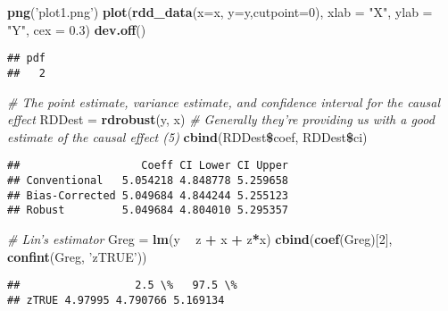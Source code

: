 \documentclass[]{article}
\newenvironment{Shaded}{\begin{snugshade}}{\end{snugshade}}
\newcommand{\KeywordTok}[1]{\textcolor[rgb]{0.13,0.29,0.53}{\textbf{#1}}}
\newcommand{\DataTypeTok}[1]{\textcolor[rgb]{0.13,0.29,0.53}{#1}}
\newcommand{\DecValTok}[1]{\textcolor[rgb]{0.00,0.00,0.81}{#1}}
\newcommand{\FloatTok}[1]{\textcolor[rgb]{0.00,0.00,0.81}{#1}}
\newcommand{\StringTok}[1]{\textcolor[rgb]{0.31,0.60,0.02}{#1}}
\newcommand{\CommentTok}[1]{\textcolor[rgb]{0.56,0.35,0.01}{\textit{#1}}}
\newcommand{\OperatorTok}[1]{\textcolor[rgb]{0.81,0.36,0.00}{\textbf{#1}}}
\newcommand{\NormalTok}[1]{#1}
\begin{document}
\begin{Shaded}
\begin{Highlighting}[]
\KeywordTok{png}\NormalTok{(}\StringTok{'plot1.png'}\NormalTok{)}
\KeywordTok{plot}\NormalTok{(}\KeywordTok{rdd_data}\NormalTok{(}\DataTypeTok{x=}\NormalTok{x, }\DataTypeTok{y=}\NormalTok{y,}\DataTypeTok{cutpoint=}\DecValTok{0}\NormalTok{), }
     \DataTypeTok{xlab =} \StringTok{"X"}\NormalTok{, }\DataTypeTok{ylab =} \StringTok{"Y"}\NormalTok{, }\DataTypeTok{cex =} \FloatTok{0.3}\NormalTok{)}
\KeywordTok{dev.off}\NormalTok{()}
\end{Highlighting}
\end{Shaded}

\begin{verbatim}
## pdf 
##   2
\end{verbatim}

\begin{Shaded}
\begin{Highlighting}[]
\CommentTok{# The point estimate, variance estimate, and confidence interval for the causal effect}
\NormalTok{RDDest =}\StringTok{ }\KeywordTok{rdrobust}\NormalTok{(y, x)}
\CommentTok{# Generally they're providing us with a good estimate of the causal effect (5)}
\KeywordTok{cbind}\NormalTok{(RDDest}\OperatorTok{\$}\NormalTok{coef, RDDest}\OperatorTok{\$}\NormalTok{ci)}
\end{Highlighting}
\end{Shaded}

\begin{verbatim}
##                   Coeff CI Lower CI Upper
## Conventional   5.054218 4.848778 5.259658
## Bias-Corrected 5.049684 4.844244 5.255123
## Robust         5.049684 4.804010 5.295357
\end{verbatim}

\begin{Shaded}
\begin{Highlighting}[]
\CommentTok{# Lin's estimator}
\NormalTok{Greg =}\StringTok{ }\KeywordTok{lm}\NormalTok{(y }\OperatorTok{~}\StringTok{ }\NormalTok{z }\OperatorTok{+}\StringTok{ }\NormalTok{x }\OperatorTok{+}\StringTok{ }\NormalTok{z}\OperatorTok{*}\NormalTok{x)}
\KeywordTok{cbind}\NormalTok{(}\KeywordTok{coef}\NormalTok{(Greg)[}\DecValTok{2}\NormalTok{], }\KeywordTok{confint}\NormalTok{(Greg, }\StringTok{'zTRUE'}\NormalTok{))}
\end{Highlighting}
\end{Shaded}

\begin{verbatim}
##                  2.5 \%   97.5 \%
## zTRUE 4.97995 4.790766 5.169134
\end{verbatim}
\end{document}
